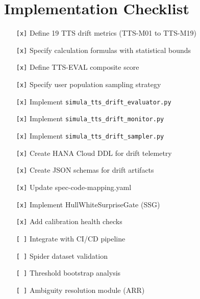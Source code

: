 \section{Implementation Checklist}

\begin{itemize}
  \item[\texttt{[x]}] Define 19 TTS drift metrics (TTS-M01 to TTS-M19)
  \item[\texttt{[x]}] Specify calculation formulas with statistical bounds
  \item[\texttt{[x]}] Define TTS-EVAL composite score
  \item[\texttt{[x]}] Specify user population sampling strategy
  \item[\texttt{[x]}] Implement \texttt{simula\_tts\_drift\_evaluator.py}
  \item[\texttt{[x]}] Implement \texttt{simula\_tts\_drift\_monitor.py}
  \item[\texttt{[x]}] Implement \texttt{simula\_tts\_drift\_sampler.py}
  \item[\texttt{[x]}] Create HANA Cloud DDL for drift telemetry
  \item[\texttt{[x]}] Create JSON schemas for drift artifacts
  \item[\texttt{[x]}] Update spec-code-mapping.yaml
  \item[\texttt{[x]}] Implement HullWhiteSurpriseGate (SSG)
  \item[\texttt{[x]}] Add calibration health checks
  \item[\texttt{[ ]}] Integrate with CI/CD pipeline
  \item[\texttt{[ ]}] Spider dataset validation
  \item[\texttt{[ ]}] Threshold bootstrap analysis
  \item[\texttt{[ ]}] Ambiguity resolution module (ARR)
\end{itemize}
